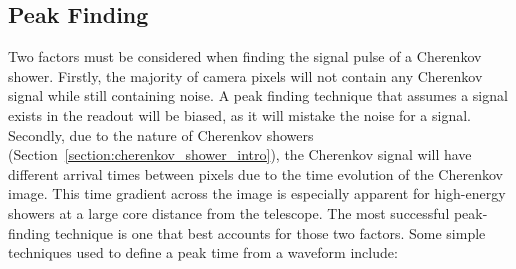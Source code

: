 \subsection{Peak Finding} \label{peakfinding}

Two factors must be considered when finding the signal pulse of a Cherenkov shower. Firstly, the majority of camera pixels will not contain any Cherenkov signal while still containing noise. A peak finding technique that assumes a signal exists in the readout will be biased, as it will mistake the noise for a signal. Secondly, due to the nature of Cherenkov showers (Section~\ref{section:cherenkov_shower_intro}), the Cherenkov signal will have different arrival times between pixels due to the time evolution of the Cherenkov image. This time gradient across the image is especially apparent for high-energy showers at a large core distance from the telescope. The most successful peak-finding technique is one that best accounts for those two factors. Some simple techniques used to define a peak time from a waveform include:
